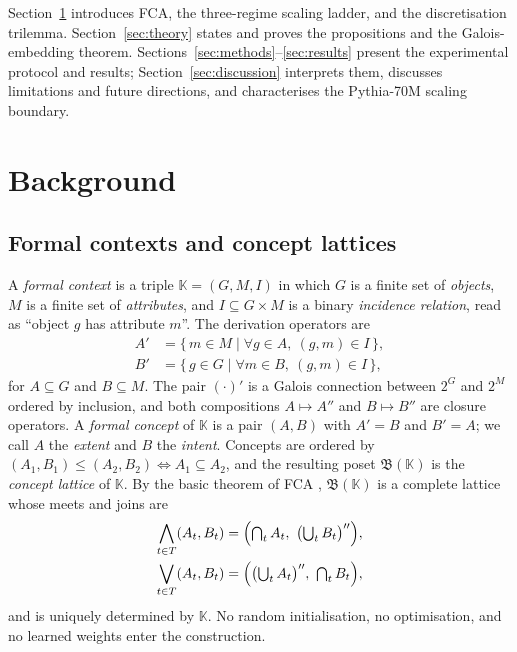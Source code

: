 \documentclass[a4paper,fleqn]{cas-dc}
\newcommand{\K}{\mathbb{K}}
\newcommand{\Lat}{\mathfrak{B}}
\begin{document}
Section~\ref{sec:background} introduces FCA, the three-regime scaling ladder, and the discretisation trilemma.
Section~\ref{sec:theory} states and proves the propositions and the Galois-embedding theorem.
Sections~\ref{sec:methods}--\ref{sec:results} present the experimental protocol and results; Section~\ref{sec:discussion} interprets them, discusses limitations and future directions, and characterises the Pythia-70M scaling boundary.

\section{Background}\label{sec:background}

\subsection{Formal contexts and concept lattices}\label{ssec:fca}

A \emph{formal context} is a triple $\K = (G, M, I)$ in which $G$ is a finite set of \emph{objects}, $M$ is a finite set of \emph{attributes}, and $I \subseteq G \times M$ is a binary \emph{incidence relation}, read as ``object $g$ has attribute $m$''.
The derivation operators are
\begin{equation}
\label{eq:derivation}
\begin{aligned}
A' &= \{\, m \in M \mid \forall g \in A,\ (g,m) \in I \,\}, \\
B' &= \{\, g \in G \mid \forall m \in B,\ (g,m) \in I \,\},
\end{aligned}
\end{equation}
for $A \subseteq G$ and $B \subseteq M$.
The pair $(\cdot)'$ is a Galois connection between $2^G$ and $2^M$ ordered by inclusion, and both compositions $A \mapsto A''$ and $B \mapsto B''$ are closure operators.
A \emph{formal concept} of $\K$ is a pair $(A, B)$ with $A' = B$ and $B' = A$; we call $A$ the \emph{extent} and $B$ the \emph{intent}.
Concepts are ordered by $(A_1, B_1) \le (A_2, B_2) \iff A_1 \subseteq A_2$, and the resulting poset $\Lat(\K)$ is the \emph{concept lattice} of $\K$.
By the basic theorem of FCA \citep{wille1982restructuring}, $\Lat(\K)$ is a complete lattice whose meets and joins are
\begin{align}
\bigwedge_{t \in T} (A_t, B_t) &= \Bigl(\textstyle\bigcap_{t} A_t,\ \bigl(\bigcup_{t} B_t\bigr)''\Bigr), \\
\bigvee_{t \in T} (A_t, B_t) &= \Bigl(\bigl(\textstyle\bigcup_{t} A_t\bigr)'',\ \textstyle\bigcap_{t} B_t\Bigr),
\end{align}
and is uniquely determined by $\K$.
No random initialisation, no optimisation, and no learned weights enter the construction.
\end{document}
